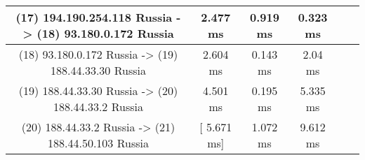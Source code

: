 \begin{table}[]
\begin{tabular}{ | c | c | c | c | c | c | }
(17) 194.190.254.118 Russia          -> (18) 93.180.0.172    Russia        & 	     2.477 ms   	 &    0.919 ms   	  &   0.323 ms   \\ \hline
(18) 93.180.0.172    Russia          -> (19) 188.44.33.30    Russia        & 	     2.604 ms   	 &    0.143 ms   	  &    2.04 ms   \\ \hline
(19) 188.44.33.30    Russia          -> (20) 188.44.33.2     Russia        & 	     4.501 ms   	 &    0.195 ms   	  &   5.335 ms   \\ \hline
(20) 188.44.33.2     Russia          -> (21) 188.44.50.103   Russia        & 	  [  5.671 ms]  	 &    1.072 ms   	  &   9.612 ms   \\ \hline

\end{tabular}
\end{table}
